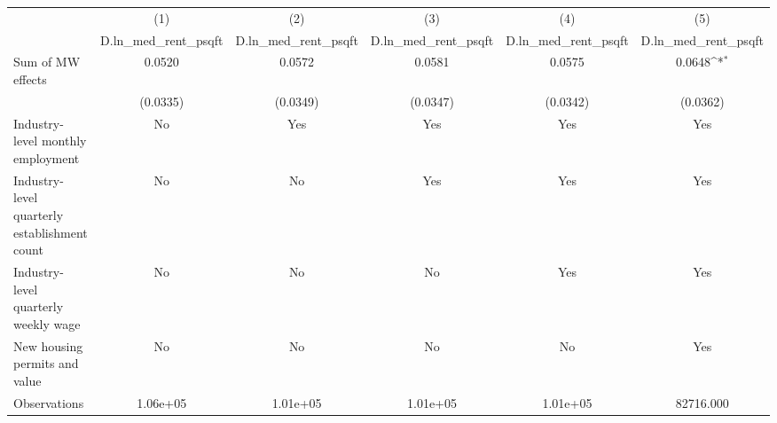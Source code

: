 {
\def\sym#1{\ifmmode^{#1}\else\(^{#1}\)\fi}
\begin{tabular}{l*{5}{c}}
\hline\hline
          &\multicolumn{1}{c}{(1)}&\multicolumn{1}{c}{(2)}&\multicolumn{1}{c}{(3)}&\multicolumn{1}{c}{(4)}&\multicolumn{1}{c}{(5)}\\
          &\multicolumn{1}{c}{D.ln\_med\_rent\_psqft}&\multicolumn{1}{c}{D.ln\_med\_rent\_psqft}&\multicolumn{1}{c}{D.ln\_med\_rent\_psqft}&\multicolumn{1}{c}{D.ln\_med\_rent\_psqft}&\multicolumn{1}{c}{D.ln\_med\_rent\_psqft}\\
\hline
Sum of MW effects&   0.0520         &   0.0572         &   0.0581         &   0.0575         &   0.0648\sym{*}  \\
          & (0.0335)         & (0.0349)         & (0.0347)         & (0.0342)         & (0.0362)         \\
\hline
Industry-level monthly employment&       No         &      Yes         &      Yes         &      Yes         &      Yes         \\
Industry-level quarterly establishment count&       No         &       No         &      Yes         &      Yes         &      Yes         \\
Industry-level quarterly weekly wage&       No         &       No         &       No         &      Yes         &      Yes         \\
New housing permits and value&       No         &       No         &       No         &       No         &      Yes         \\
Observations& 1.06e+05         & 1.01e+05         & 1.01e+05         & 1.01e+05         &82716.000         \\
\hline\hline
\end{tabular}
}
